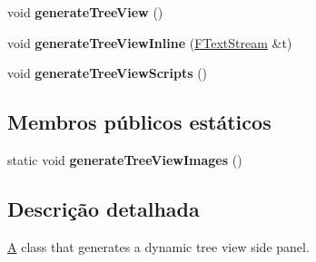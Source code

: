 \begin{DoxyCompactItemize}
\item 
\hypertarget{class_f_t_v_help_a191f63d2f9bef6b4937d154c1585d2e6}{void {\bfseries generate\-Tree\-View} ()}\label{class_f_t_v_help_a191f63d2f9bef6b4937d154c1585d2e6}

\item 
\hypertarget{class_f_t_v_help_a2f560c1832d33db082730b03d025a20c}{void {\bfseries generate\-Tree\-View\-Inline} (\hyperlink{class_f_text_stream}{F\-Text\-Stream} \&t)}\label{class_f_t_v_help_a2f560c1832d33db082730b03d025a20c}

\item 
\hypertarget{class_f_t_v_help_a0c2afd4f49542796a6b3b36ea9c0b5f0}{void {\bfseries generate\-Tree\-View\-Scripts} ()}\label{class_f_t_v_help_a0c2afd4f49542796a6b3b36ea9c0b5f0}

\end{DoxyCompactItemize}
\subsection*{Membros públicos estáticos}
\begin{DoxyCompactItemize}
\item 
\hypertarget{class_f_t_v_help_a87b6a291ec7be129de2486fe965d4cf7}{static void {\bfseries generate\-Tree\-View\-Images} ()}\label{class_f_t_v_help_a87b6a291ec7be129de2486fe965d4cf7}

\end{DoxyCompactItemize}


\subsection{Descrição detalhada}
\hyperlink{class_a}{A} class that generates a dynamic tree view side panel. 

